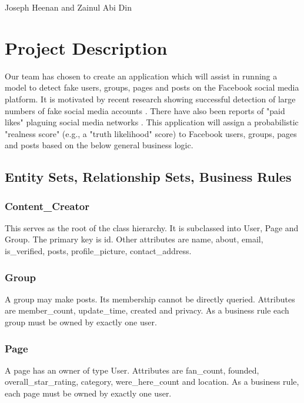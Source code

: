 \documentclass{article}
\begin{document}
\begin{center}
\begin{LARGE}{Joseph Heenan and Zainul Abi Din} \end{LARGE}
\end{center}

\section{Project Description}

Our team has chosen to create an application which will assist in running a model to detect fake users, groups, pages and posts on the Facebook social media platform. It is motivated by recent research showing successful detection of large numbers of fake social media accounts \cite{2017arXiv170102405E}. There have also been reports of "paid likes"  plaguing social media networks \cite{TheBotBubble}. This application will assign a probabilistic "realness score" (e.g., a "truth likelihood" score) to Facebook users, groups, pages and posts based on the below general business logic.

\subsection{Entity Sets, Relationship Sets, Business Rules}

\subsubsection{Content_Creator}
This serves as the root of the class hierarchy. It is subclassed into User, Page and Group. The primary key is id. Other attributes are name, about, email, is_verified, posts, profile_picture, contact_address.

\subsubsection{Group}
A group may make posts. Its membership cannot be directly queried. Attributes are member_count, update_time, created and privacy. As a business rule each group must be owned by exactly one user.

\subsubsection{Page}
A page has an owner of type User. Attributes are fan_count, founded, overall_star_rating, category, were_here_count and location.  As a business rule, each page must be owned by exactly one user.
\end{document}
